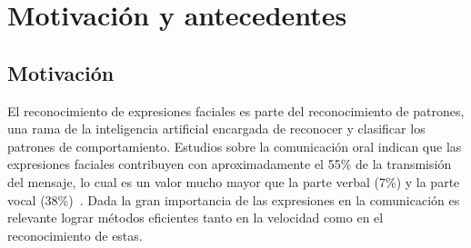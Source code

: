 \documentclass{article}
\begin{document}
\newpage
\section{Motivación y antecedentes}
    \subsection{Motivación}
    El reconocimiento de expresiones faciales es parte del reconocimiento de patrones, una rama de la inteligencia artificial encargada de reconocer y clasificar los patrones de comportamiento. Estudios sobre la comunicación oral indican que las expresiones faciales contribuyen con aproximadamente el 55\%  de la transmisión del mensaje, lo cual es un valor mucho mayor que la parte verbal (7\%) y la parte vocal (38\%)~\cite{commun1}. Dada la gran importancia de las expresiones en la comunicación es relevante lograr métodos eficientes tanto en la velocidad como en el reconocimiento de estas.
\end{document}
